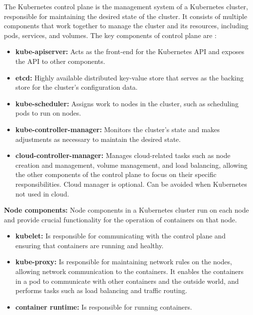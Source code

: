 The Kubernetes control plane is the management system of a Kubernetes cluster, responsible for maintaining the desired state of the cluster. It consists of multiple components that work together to manage the cluster and its resources, including pods, services, and volumes. The key components of control plane are \cite{Sayfan2020}:
\begin{itemize}
\item \textbf{kube-apiserver:} Acts as the front-end for the Kubernetes API and exposes the API to other components. \cite{kubedocu2022}
\item \textbf{etcd:} Highly available distributed key-value store that serves as the backing store for the cluster's configuration data. \cite{Dobies2020}
\item \textbf{kube-scheduler:} Assigns work to nodes in the cluster, such as scheduling pods to run on nodes. \cite{kubeUpAndRunning}
\item \textbf{kube-controller-manager:} Monitors the cluster's state and makes adjustments as necessary to maintain the desired state. \cite{Sayfan2020}
\item \textbf{cloud-controller-manager:} Manages cloud-related tasks such as node creation and management, volume management, and load balancing, allowing the other components of the control plane to focus on their specific responsibilities. Cloud manager is optional. Can be avoided when Kubernetes not used in cloud. \cite{kubedocu2022}
\end{itemize}
\textbf{Node components:} 
Node components in a Kubernetes cluster run on each node and provide crucial functionality for the operation of containers on that node. \cite{kubedocu2022}
\begin{itemize}
\item \textbf{kubelet:} Is responsible for communicating with the control plane and ensuring that containers are running and healthy. \cite{kubeUpAndRunning}
\item \textbf{kube-proxy:} Is responsible for maintaining network rules on the nodes, allowing network communication to the containers. It enables the containers in a pod to communicate with other containers and the outside world, and performs tasks such as load balancing and traffic routing. \cite{kubeUpAndRunning}
\item \textbf{container runtime:} Is responsible for running containers. \cite{kubedocu2022}
\end{itemize}



